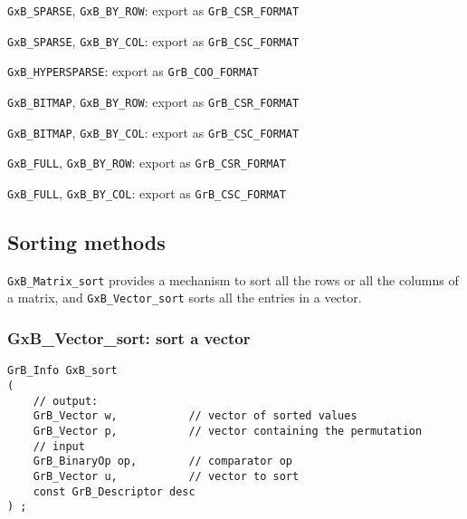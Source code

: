 \documentclass[12pt]{article}
\newenvironment{packed_itemize}{
\begin{itemize}
  \setlength{\itemsep}{1pt}
  \setlength{\parskip}{0pt}
  \setlength{\parsep}{0pt}
}{\end{itemize}}
\begin{document}
\begin{packed_itemize}
\item \verb'GxB_SPARSE', \verb'GxB_BY_ROW': export as \verb'GrB_CSR_FORMAT'
\item \verb'GxB_SPARSE', \verb'GxB_BY_COL': export as \verb'GrB_CSC_FORMAT'
\item \verb'GxB_HYPERSPARSE': export as \verb'GrB_COO_FORMAT'
\item \verb'GxB_BITMAP', \verb'GxB_BY_ROW': export as \verb'GrB_CSR_FORMAT'
\item \verb'GxB_BITMAP', \verb'GxB_BY_COL': export as \verb'GrB_CSC_FORMAT'
\item \verb'GxB_FULL', \verb'GxB_BY_ROW': export as \verb'GrB_CSR_FORMAT'
\item \verb'GxB_FULL', \verb'GxB_BY_COL': export as \verb'GrB_CSC_FORMAT'
\end{packed_itemize}

\newpage
\subsection{Sorting methods}
\label{sorting_methods}

\verb'GxB_Matrix_sort' provides a mechanism to sort all the rows or
all the columns of a matrix, and \verb'GxB_Vector_sort' sorts all the
entries in a vector.

\subsubsection{{\sf GxB\_Vector\_sort:} sort a vector}
\label{vector_sort}

\begin{mdframed}[userdefinedwidth=6in]
{\footnotesize
\begin{verbatim}
GrB_Info GxB_sort
(
    // output:
    GrB_Vector w,           // vector of sorted values
    GrB_Vector p,           // vector containing the permutation
    // input
    GrB_BinaryOp op,        // comparator op
    GrB_Vector u,           // vector to sort
    const GrB_Descriptor desc
) ;
\end{verbatim}
} \end{mdframed}
\end{document}
